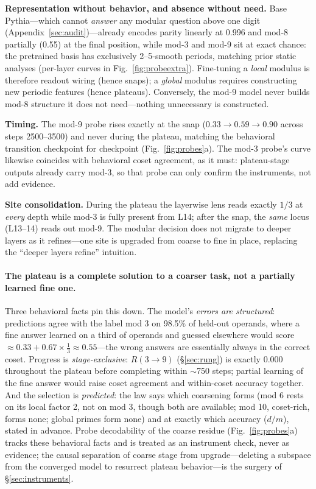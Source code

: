 \documentclass{article} %
\begin{document}
\textbf{Representation without behavior, and absence without need.} Base Pythia---which cannot \emph{answer} any modular question above one digit (Appendix~\ref{sec:audit})---already encodes parity linearly at 0.996 and mod-8 partially (0.55) at the final position, while mod-3 and mod-9 sit at exact chance: the pretrained basis has exclusively 2--5-smooth periods, matching prior static analyses \citep{zhou2024fourier,levy2024digits,kantamneni2025trig,subspaces2025addition} (per-layer curves in Fig.~\ref{fig:probeextra}). Fine-tuning a \emph{local} modulus is therefore readout wiring (hence snaps); a \emph{global} modulus requires constructing new periodic features (hence plateaus). Conversely, the mod-9 model never builds mod-8 structure it does not need---nothing unnecessary is constructed.

\textbf{Timing.} The mod-9 probe rises exactly at the snap ($0.33 \to 0.59 \to 0.90$ across steps 2500--3500) and never during the plateau, matching the behavioral transition checkpoint for checkpoint (Fig.~\ref{fig:probes}a). The mod-3 probe's curve likewise coincides with behavioral coset agreement, as it must: plateau-stage outputs already carry mod-3, so that probe can only confirm the instruments, not add evidence.

\textbf{Site consolidation.} During the plateau the layerwise lens reads exactly $1/3$ at \emph{every} depth while mod-3 is fully present from L14; after the snap, the \emph{same} locus (L13--14) reads out mod-9. The modular decision does not migrate to deeper layers as it refines---one site is upgraded from coarse to fine in place, replacing the ``deeper layers refine'' intuition.

\paragraph{The plateau is a complete solution to a coarser task, not a partially learned fine one.} Three behavioral facts pin this down. The model's \emph{errors are structured}: predictions agree with the label mod 3 on 98.5\% of held-out operands, where a fine answer learned on a third of operands and guessed elsewhere would score $\approx 0.33 + 0.67 \times \tfrac{1}{3} \approx 0.55$---the wrong answers are essentially always in the correct coset. Progress is \emph{stage-exclusive}: $R(3{\to}9)$ (\S\ref{sec:rung}) is exactly $0.000$ throughout the plateau before completing within $\sim$750 steps; partial learning of the fine answer would raise coset agreement and within-coset accuracy together. And the selection is \emph{predicted}: the law says which coarsening forms (mod 6 rests on its local factor 2, not on mod 3, though both are available; mod 10, coset-rich, forms none; global primes form none) and at exactly which accuracy ($d/m$), stated in advance. Probe decodability of the coarse residue (Fig.~\ref{fig:probes}a) tracks these behavioral facts and is treated as an instrument check, never as evidence; the causal separation of coarse stage from upgrade---deleting a subspace from the converged model to resurrect plateau behavior---is the surgery of \S\ref{sec:instruments}.
\end{document}

